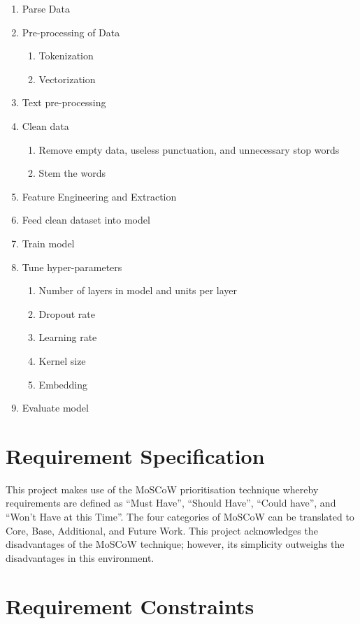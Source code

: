 \begin{enumerate}
    \item Parse Data
    \item Pre-processing of Data
    \begin{enumerate}
        \item Tokenization
        \item Vectorization
    \end{enumerate}
\item Text pre-processing
\item Clean data
    \begin{enumerate}
        \item Remove empty data, useless punctuation, and unnecessary stop words
        \item Stem the words
    \end{enumerate}
\item Feature Engineering and Extraction
\item Feed clean dataset into model
\item Train model
\item Tune hyper-parameters
    \begin{enumerate}
        \item Number of layers in model and units per layer
        \item Dropout rate
        \item Learning rate
        \item Kernel size
        \item Embedding
    \end{enumerate}
\item Evaluate model
\end{enumerate}

\section{Requirement Specification}

This project makes use of the MoSCoW prioritisation technique whereby requirements are defined as “Must Have”, “Should Have”, “Could have”, and “Won’t Have at this Time”. The four categories of MoSCoW can be translated to Core, Base, Additional, and Future Work. This project acknowledges the disadvantages of the MoSCoW technique; however, its simplicity outweighs the disadvantages in this environment.

\section{Requirement Constraints}

